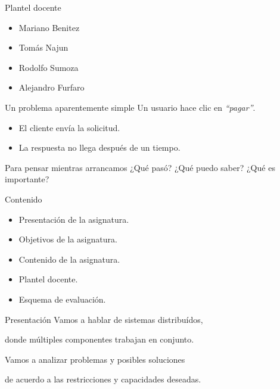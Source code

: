 \documentclass[institutional,screen,none]{ua-engineering-v6-beamer}
\title{\UACourse}
\subtitle{Clase 01 --- Pensamiento distribuido}
\author{\UAProfessor}
\date{\UADate}
\begin{document}
{
\begin{frame}[plain]
\titlepage
\end{frame}
}


\begin{frame}{Plantel docente}
    \begin{itemize}
        \item Mariano Benitez
        \item Tomás Najun
        \item Rodolfo Sumoza
        \item Alejandro Furfaro
    \end{itemize}
\end{frame}

    
\begin{frame}{Un problema aparentemente simple}
    Un usuario hace clic en \emph{“pagar”}.

    \begin{itemize}
        \item El cliente envía la solicitud.
        \item La respuesta no llega después de un tiempo.
    \end{itemize}

    \begin{block}{Para pensar mientras arrancamos}
        ¿Qué pasó?
        ¿Qué puedo saber?
        ¿Qué es importante?
    \end{block}
\end{frame}


\begin{frame}{Contenido}
    \begin{itemize}
        \item Presentación de la asignatura.
        \item Objetivos de la asignatura.
        \item Contenido de la asignatura.
        \item Plantel docente.
        \item Esquema de evaluación.
    \end{itemize}
\end{frame}

\begin{frame}{Presentación}
    \centering
    \large
    Vamos a hablar de sistemas distribuídos, 
    
    donde múltiples componentes trabajan en conjunto.
    
    \vspace{1.4em}
    Vamos a analizar problemas y posibles soluciones 
    
    de acuerdo a las restricciones y capacidades deseadas. 
\end{frame}
\end{document}
